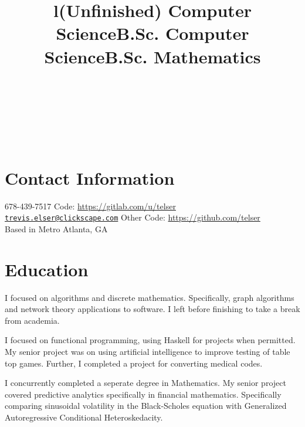 \documentclass[margintitle,line]{res}
\begin{document}

\begin{resume}

\begin{format}
\\
\title{l}\\
\body\\
\end{format}

\section{Contact Information}

678-439-7517  \hfill {Code:}
\href{https://gitlab.com/u/telser}{https://gitlab.com/u/telser}  \\
\href{mailto:trevis.elser@clickscape.com}{\nolinkurl{trevis.elser@clickscape.com}} \hfill {Other Code:} \href{https://github.com/telser}{https://github.com/telser} \\
Based in Metro Atlanta, GA

\section{Education}

\title{(Unfinished) Computer Science}
\begin{position}
I focused on algorithms and discrete mathematics. Specifically, graph
algorithms and network theory applications to software. I left before
finishing to take a break from academia.
\end{position}

\title{B.Sc. Computer Science}
\begin{position}
I focused on functional programming, using Haskell for projects when
permitted. My senior project was on using artificial intelligence to
improve testing of table top games. Further, I completed a project for
converting medical codes.
\end{position}

\title{B.Sc. Mathematics}
\begin{position}
I concurrently completed a seperate degree in Mathematics. My senior
project covered predictive analytics specifically in financial
mathematics. Specifically comparing sinusoidal volatility in the
Black-Scholes equation with Generalized Autoregressive Conditional
Heteroskedacity.
\end{position}


\end{resume}
\end{document}
